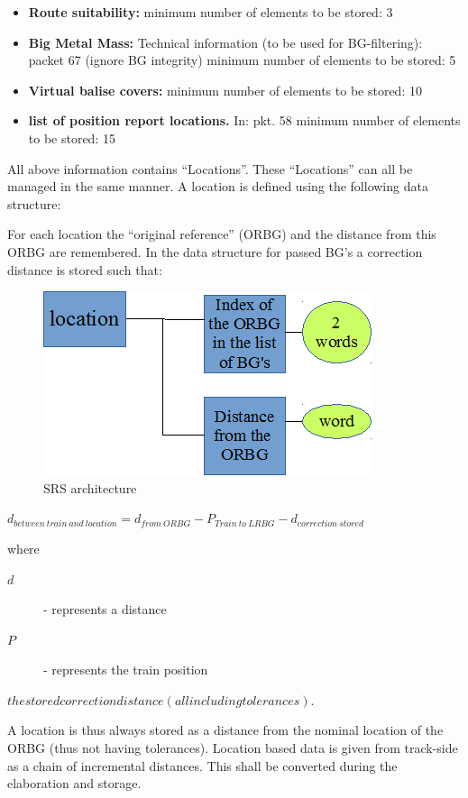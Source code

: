 \documentclass{template/openetcs_report}
\begin{document}
\begin{itemize}
\item \textbf{Route suitability:} minimum number of elements to be stored: 3
\item \textbf{Big Metal Mass:} Technical information (to be used for BG-filtering): packet 67 (ignore BG integrity)  minimum number of elements to be stored: 5
\item \textbf{Virtual balise covers:}  minimum number of elements to be stored: 10
\item \textbf{list of position report locations.} In: pkt. 58  minimum number of elements to be stored: 15
\end{itemize}

All above information contains “Locations”. These “Locations” can all be managed in the same manner. A location is defined using the following data structure:

For each location the “original reference” (ORBG) and the distance from this ORBG are remembered. 
In the data structure for passed BG's a correction distance is stored such that:

\begin{figure}[hbtp]
\centering
\includegraphics[angle=0, scale=0.9] {images/ORBG.png}
\caption{SRS architecture}
\end{figure}


$d_{ between~train~and~location} =
d_{from~ORBG} - P_{Train~to~ LRBG}  -  d_{correction~stored}$


where
\begin{description}
   \item[$d$] - represents a distance
   \item[$P$] - represents the train position
\end{description}
$the stored correction distance (all including tolerances)$.

A location is thus always stored as a distance from the nominal location of the ORBG (thus not having tolerances). Location based data is given from track-side as a chain of incremental distances. This shall be converted during the elaboration and storage.
\end{document}

